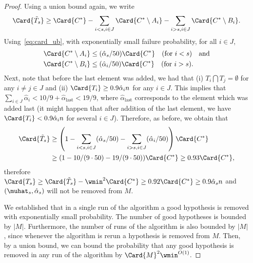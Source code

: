 \begin{proof}
Using a union bound again, we write
\begin{equation*}
    \Card{\tilde T_s} \geq 
    \Card{C^{\ast}} 
    - \sum_{i < s, i \in J} \Card{C^{\ast} \setminus A_i} 
    - \sum_{i > s, i \in J} \Card{C^{\ast} \setminus B_i}.
\end{equation*}
Using~\cref{eq:card_ub}, with exponentially small failure probability, for all \(i \in J\),
\begin{equation*}
    \begin{aligned}
    \Card{C^{\ast} \setminus A_i} &\leq (\hat\alpha_s / 50) \Card{C^{\ast}} \quad \text{(for } i < s \text{)} \quad \text{and} \\
    \Card{C^{\ast} \setminus B_i} &\leq (\hat\alpha_i / 50) \Card{C^{\ast}} \quad \text{(for } i > s \text{)}.
    \end{aligned}
\end{equation*}
Next, note that before the last element was added, we had that 
(i) \(T_i \bigcap T_j = \emptyset\) for any \(i \neq j \in J\) and 
(ii) \(\Card{T_i} \geq 0.9\hat\alpha_i n\) for any \(i \in J\).
This implies that \(\sum_{i \in J} \hat\alpha_i < 10/9 + \hat\alpha_{\text{last}} < 19/9\), 
where \(\hat\alpha_{\text{last}}\) corresponds to the element which was added last 
(it might happen that after addition of the last element, we have \(\Card{T_i} < 0.9\hat\alpha_i n\) for several \(i \in J\)). 
Therefore, as before, we obtain that 
\begin{equation*}
    \begin{aligned}
    \Card{\tilde T_s} &\geq \left(1 - \sum_{i < s, i \in J} (\hat\alpha_s / 50) - \sum_{i > s, i \in J} (\hat\alpha_i / 50)\right) \Card{C^{\ast}} \\
    &\geq  (1 - 10/(9 \cdot 50) - 19 / (9 \cdot 50)) \Card{C^{\ast}} \geq 0.93 \Card{C^{\ast}},
    \end{aligned}
\end{equation*}
therefore 
\(\Card{T_s} \geq \Card{\tilde T_s} - \wmin^2 \Card{C^{\ast}} \geq 0.92 \Card{C^{\ast}} \geq 0.9\hat\alpha_s n\) and \((\muhat_s, \hat\alpha_s)\) will not be removed from \(M\).

We established that in a single run of the algorithm a good hypothesis is removed with exponentially small probability.
The number of good hypotheses is bounded by $|M|$.
Furthermore, the number of runs of the algorithm is also bounded by $|M|$, since whenever the algorithm is rerun a hypothesis is removed from $M$.
Then, by a union bound, we can bound the probability that any good hypothesis is removed in any run of the algorithm by $\Card{M}^2 \wmin^{O(1)}$.
\end{proof}